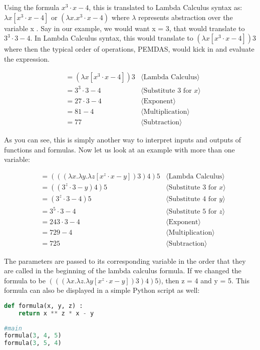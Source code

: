 \documentclass{article}
\begin{document}
\medskip\noindent
Using the formula $x^3 \cdot x-4$, this is translated to Lambda Calculus syntax as: $\lambda x[x^3 \cdot x-4]$ or $(\lambda x.   x^3 \cdot x-4)$ where $\lambda$ represents abstraction over the variable x \cite{Lambda Calculus}. Say in our example, we would want x = 3, that would translate to $3^3 \cdot 3-4$. In Lambda Calculus syntax, this would translate to $(\lambda x[x^3 \cdot x-4])$3 where then the typical order of operations, PEMDAS, would kick in and evaluate the expression. 

\begin{align}
&=(\lambda x[x^3 \cdot x-4])3 
    &\langle\text{Lambda Calculus}\rangle \\
&= 3^3 \cdot 3-4
   &\langle \text{Substitute 3 for } x\rangle \\
&= 27 \cdot 3-4
   &\langle\text{Exponent}\rangle \\
&= 81 - 4
   &\langle\text{Multiplication}\rangle \\
&= 77
   &\langle\text{Subtraction}\rangle
\end{align}

\noindent
As you can see, this is simply another way to interpret inputs and outputs of functions and formulas. Now let us look at an example with more than one variable:

\begin{align}
&=(((\lambda x.\lambda y.\lambda z [x^z \cdot x-y])3)4)5
    &\langle\text{Lambda Calculus}\rangle \\
&= ((3^z \cdot 3-y)4)5
   &\langle \text{Substitute 3 for } x\rangle \\
&= (3^z \cdot 3-4)5
   &\langle \text{Substitute 4 for } y\rangle \\
&= 3^5 \cdot 3-4
   &\langle \text{Substitute 5 for } z\rangle \\
&= 243 \cdot 3-4
   &\langle\text{Exponent}\rangle \\
&= 729 - 4
   &\langle\text{Multiplication}\rangle \\
&= 725
   &\langle\text{Subtraction}\rangle
\end{align}

\noindent
The parameters are passed to its corresponding variable in the order that they are called in the beginning of the lambda calculus formula. If we changed the formula to be $(((\lambda x.\lambda z.\lambda y [x^z \cdot x-y])3)4)5)$, then z = 4 and y = 5. This formula can also be displayed in a simple Python script as well:

\begin{lstlisting}[language=Python]
def formula(x, y, z) :
    return x ** z * x - y
    
#main
formula(3, 4, 5)
formula(3, 5, 4)
\end{lstlisting}
\end{document}
